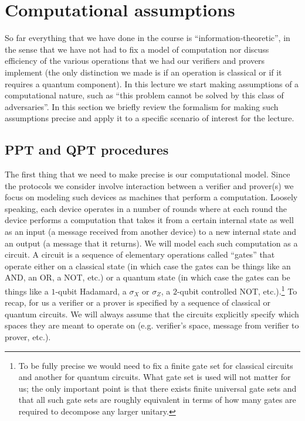 \section{Computational assumptions}

So far everything that we have done in the course is ``information-theoretic'', in the sense that we have not had to fix a model of computation nor discuss efficiency of the various operations that we had our verifiers and provers implement (the only distinction we made is if an operation is classical or if it requires a quantum component). In this lecture we start making assumptions of a computational nature, such as ``this problem cannot be solved by this class of adversaries''. In this section we briefly review the formalism for making such assumptions precise and apply it to a specific scenario  of interest for the lecture. 

\subsection{PPT and QPT procedures}

The first thing that we need to make precise is our computational model. Since the protocols we consider involve interaction between a verifier and prover(s) we focus on modeling such devices as machines that perform a computation. Loosely speaking, each device operates in a number of rounds where at each round the device performs a computation that takes it from a certain internal state as well as an input (a message received from another device) to a new internal state and an output (a message that it returns). We will model each such computation as a circuit. A circuit is a sequence of elementary operations called ``gates'' that operate either on a classical state (in which case the gates can be things like an AND, an OR, a NOT, etc.) or a quantum state (in which case the gates can be things like a $1$-qubit Hadamard, a $\sigma_X$ or $\sigma_Z$, a $2$-qubit controlled NOT, etc.).\footnote{To be fully precise we would need to fix a finite gate set for classical circuits and another for quantum circuits. What gate set is used will not matter for us; the only important point is that there exists finite universal gate sets and that all such gate sets are roughly equivalent in terms of how many gates are required to decompose any larger unitary.} To recap, for us a verifier or a prover is specified by a sequence of classical or quantum circuits. We will always assume that the circuits explicitly specify which spaces they are meant to operate on (e.g. verifier's space, message from verifier to prover, etc.). 

